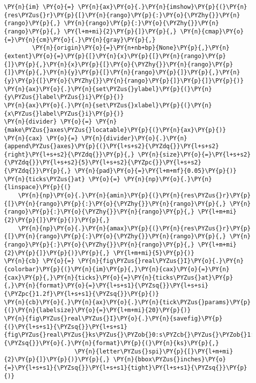 \begin{Verbatim}[commandchars=\\\{\}]
\PY{n}{im} \PY{o}{=} \PY{n}{ax}\PY{o}{.}\PY{n}{imshow}\PY{p}{(}\PY{n}{res\PYZus{}r}\PY{p}{[}\PY{n}{rango}\PY{p}{:}\PY{o}{\PYZhy{}}\PY{n}{rango}\PY{p}{,} \PY{n}{rango}\PY{p}{:}\PY{o}{\PYZhy{}}\PY{n}{rango}\PY{p}{,} \PY{l+m+mi}{2}\PY{p}{]}\PY{p}{,} \PY{n}{cmap}\PY{o}{=}\PY{n}{cm}\PY{o}{.}\PY{n}{gray}\PY{p}{,}
        \PY{n}{origin}\PY{o}{=}\PY{n+nb+bp}{None}\PY{p}{,}\PY{n}{extent}\PY{o}{=}\PY{p}{[}\PY{n}{x}\PY{p}{[}\PY{n}{rango}\PY{p}{]}\PY{p}{,}\PY{n}{x}\PY{p}{[}\PY{o}{\PYZhy{}}\PY{n}{rango}\PY{p}{]}\PY{p}{,}\PY{n}{y}\PY{p}{[}\PY{n}{rango}\PY{p}{]}\PY{p}{,}\PY{n}{y}\PY{p}{[}\PY{o}{\PYZhy{}}\PY{n}{rango}\PY{p}{]}\PY{p}{]}\PY{p}{)}
\PY{n}{ax}\PY{o}{.}\PY{n}{set\PYZus{}ylabel}\PY{p}{(}\PY{n}{y\PYZus{}label\PYZus{}i}\PY{p}{)}
\PY{n}{ax}\PY{o}{.}\PY{n}{set\PYZus{}xlabel}\PY{p}{(}\PY{n}{x\PYZus{}label\PYZus{}i}\PY{p}{)}
\PY{n}{divider} \PY{o}{=} \PY{n}{make\PYZus{}axes\PYZus{}locatable}\PY{p}{(}\PY{n}{ax}\PY{p}{)}
\PY{n}{cax} \PY{o}{=} \PY{n}{divider}\PY{o}{.}\PY{n}{append\PYZus{}axes}\PY{p}{(}\PY{l+s+s2}{\PYZdq{}}\PY{l+s+s2}{right}\PY{l+s+s2}{\PYZdq{}}\PY{p}{,} \PY{n}{size}\PY{o}{=}\PY{l+s+s2}{\PYZdq{}}\PY{l+s+s2}{5}\PY{l+s+s2}{\PYZpc{}}\PY{l+s+s2}{\PYZdq{}}\PY{p}{,} \PY{n}{pad}\PY{o}{=}\PY{l+m+mf}{0.05}\PY{p}{)}
\PY{n}{ticks\PYZus{}at} \PY{o}{=} \PY{n}{np}\PY{o}{.}\PY{n}{linspace}\PY{p}{(}
    \PY{n}{np}\PY{o}{.}\PY{n}{amin}\PY{p}{(}\PY{n}{res\PYZus{}r}\PY{p}{[}\PY{n}{rango}\PY{p}{:}\PY{o}{\PYZhy{}}\PY{n}{rango}\PY{p}{,} \PY{n}{rango}\PY{p}{:}\PY{o}{\PYZhy{}}\PY{n}{rango}\PY{p}{,} \PY{l+m+mi}{2}\PY{p}{]}\PY{p}{)}\PY{p}{,}
    \PY{n}{np}\PY{o}{.}\PY{n}{amax}\PY{p}{(}\PY{n}{res\PYZus{}r}\PY{p}{[}\PY{n}{rango}\PY{p}{:}\PY{o}{\PYZhy{}}\PY{n}{rango}\PY{p}{,} \PY{n}{rango}\PY{p}{:}\PY{o}{\PYZhy{}}\PY{n}{rango}\PY{p}{,} \PY{l+m+mi}{2}\PY{p}{]}\PY{p}{)}\PY{p}{,} \PY{l+m+mi}{5}\PY{p}{)}
\PY{n}{cb} \PY{o}{=} \PY{n}{fig\PYZus{}real\PYZus{}I}\PY{o}{.}\PY{n}{colorbar}\PY{p}{(}\PY{n}{im}\PY{p}{,}\PY{n}{cax}\PY{o}{=}\PY{n}{cax}\PY{p}{,}\PY{n}{ticks}\PY{o}{=}\PY{n}{ticks\PYZus{}at}\PY{p}{,}\PY{n}{format}\PY{o}{=}\PY{l+s+s1}{\PYZsq{}}\PY{l+s+si}{\PYZpc{}1.2f}\PY{l+s+s1}{\PYZsq{}}\PY{p}{)}
\PY{n}{cb}\PY{o}{.}\PY{n}{ax}\PY{o}{.}\PY{n}{tick\PYZus{}params}\PY{p}{(}\PY{n}{labelsize}\PY{o}{=}\PY{l+m+mi}{20}\PY{p}{)}
\PY{n}{fig\PYZus{}real\PYZus{}I}\PY{o}{.}\PY{n}{savefig}\PY{p}{(}\PY{l+s+s1}{\PYZsq{}}\PY{l+s+s1}{fig\PYZus{}real\PYZus{}ks\PYZus{}\PYZob{}0:s\PYZcb{}\PYZus{}\PYZob{}1:s\PYZcb{}}\PY{l+s+s1}{\PYZsq{}}\PY{o}{.}\PY{n}{format}\PY{p}{(}\PY{n}{ks}\PY{p}{,}
                    \PY{n}{letter\PYZus{}spi}\PY{p}{[}\PY{l+m+mi}{2}\PY{p}{]}\PY{p}{)}\PY{p}{,} \PY{n}{bbox\PYZus{}inches}\PY{o}{=}\PY{l+s+s1}{\PYZsq{}}\PY{l+s+s1}{tight}\PY{l+s+s1}{\PYZsq{}}\PY{p}{)}

\end{Verbatim}
